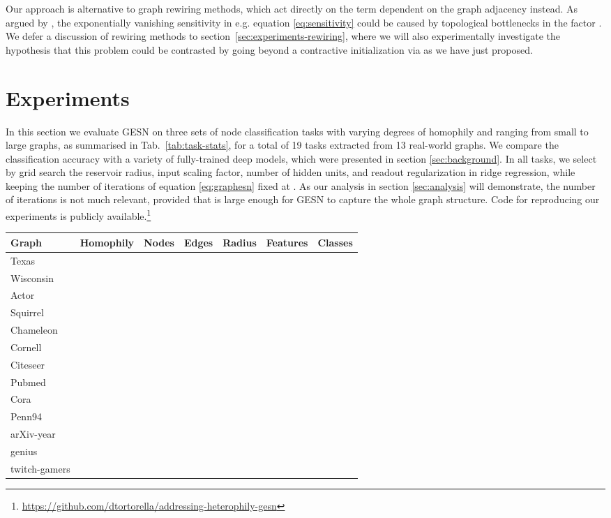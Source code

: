 \documentclass[final,5p,times,twocolumn]{elsarticle}
\begin{document}
Our approach is alternative to graph rewiring methods, which act directly on the term dependent on the graph adjacency  instead.
As argued by \cite{Topping2022}, the exponentially vanishing sensitivity in e.g. equation \eqref{eq:sensitivity} could be caused by topological bottlenecks in the factor .
We defer a discussion of rewiring methods to section~\ref{sec:experiments-rewiring}, where we will also experimentally investigate the hypothesis that this problem could be contrasted by going beyond a contractive initialization via  as we have just proposed.

\section{Experiments}
\label{sec:experiments}

In this section we evaluate GESN on three sets of node classification tasks with varying degrees of homophily and ranging from small to large graphs, as summarised in Tab.~\ref{tab:task-stats}, for a total of 19 tasks extracted from 13 real-world graphs.
We compare the classification accuracy with a variety of fully-trained deep models, which were presented in section \ref{sec:background}.
In all tasks, we select by grid search the reservoir radius, input scaling factor, number of hidden units, and readout regularization in ridge regression, while keeping the number of iterations of equation \eqref{eq:graphesn} fixed at .
As our analysis in section \ref{sec:analysis} will demonstrate, the number of iterations is not much relevant, provided that  is large enough for GESN to capture the whole graph structure.
Code for reproducing our experiments is publicly available.\footnote{\url{https://github.com/dtortorella/addressing-heterophily-gesn}}

\begin{table*}
	\centering
	\begin{tabular}{lcrrrrc}
		\toprule
		\textbf{Graph} & \textbf{Homophily} & \textbf{Nodes} & \textbf{Edges} & \textbf{Radius}  & \textbf{Features} & \textbf{Classes} \\
		\midrule
		Texas &  &  &  &  &  &  \\
		Wisconsin &  &  &  &  &  &  \\
		Actor &  &  &  &  &  &  \\
		Squirrel &  &  &  &  &  &  \\
		Chameleon &  &  &  &  &  &  \\
		Cornell &  &  &  &  &  &  \\
		\midrule
		Citeseer &  &  &  &  &  &  \\
		Pubmed &  &  &  &  &  &  \\
		Cora &  &  &  &  &  &  \\
		\midrule
		Penn94 &  &  &  &  &  &  \\
		arXiv-year &  &  &  &  &  &  \\
		genius &  &  &  &  &  &  \\
		twitch-gamers &  &  &  &  &  &  \\
		\bottomrule
	\end{tabular}
\caption{Statistics on the graphs employed in the node classification tasks.}
\label{tab:task-stats}
\end{table*}
\end{document}
